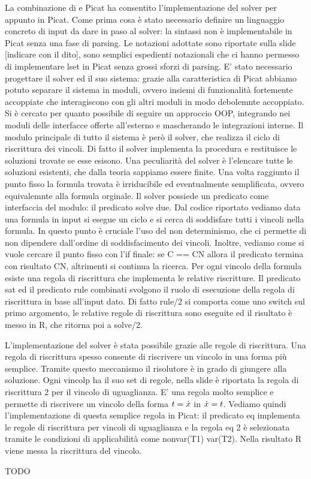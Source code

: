 \documentclass[11pt]{article}
\begin{document}
La combinazione di \lset{} e Picat ha consentito l'implementazione del
solver per \lset{} appunto in Picat. Come prima cosa è stato
necessario definire un linguaggio concreto di input da dare in paso al
solver: la sintassi \lset{} non è implementabile in Picat senza una
fase di parsing. Le notazioni adottate sono riportate sulla slide
[indicare con il dito], sono semplici espedienti notazionali che ci
hanno permesso di implementare lset in Picat senza grossi sforzi di
parsing. E' stato necessario progettare il solver ed il suo sistema:
grazie alla caratteristica di Picat abbiamo potuto separare il sistema
in moduli, ovvero insiemi di funzionalità fortemente accoppiate che
interagiscono con gli altri moduli in modo debolemnte accoppiato. Si è
cercato per quanto possibile di seguire un approccio OOP, integrando
nei moduli delle interfacce offerte all'esterno e mascherando le
integrazioni interne. Il modulo principale di tutto il sistema è però
il solver, che realizza il ciclo di riscrittura dei vincoli. Di fatto
il solver implementa la procedura \satset{} e restituisce le soluzioni
trovate se esse esisono. Una peculiarità del solver è l'elencare tutte
le soluzioni esistenti, che dalla teoria sappiamo essere finite. Una
volta raggiunto il punto fisso la formula trovata è irriducibile ed
eventualmente semplificata, ovvero equivalemnte alla formula
orginale. Il solver possiede un predicato come interfaccia del modulo:
il predicato solve due. Dal codice riportato vediamo data una formula
in input si esegue un ciclo e si cerca di soddisfare tutti i vincoli
nella formula. In questo punto è cruciale l'uso del non determinismo,
che ci permette di non dipendere dall'ordine di soddisfacimento dei
vincoli. Inoltre, vediamo come si vuole cercare il punto fisso con
l'if finale: se C == CN allora il predicato termina con risultato CN,
altrimenti si continua la ricerca. Per ogni vincolo della formula
esiste una regola di riscrittura che implementa le relative
riscritture. Il predicato sat ed il predicato rule combinati svolgono
il ruolo di esecuzione della regola di riscrittura in base all'input
dato. Di fatto rule/2 si comporta come uno switch sul primo argomento,
le relative regole di riscrittura sono eseguite ed il risultato è
messo in R, che ritorna poi a solve/2.

L'implementazione del solver è stata possibile grazie alle regole di
riscrittura. Una regola di riscrittura spesso consente di riscrivere
un vincolo in una forma più semplice. Tramite questo meccanismo il
risolutore è in grado di giungere alla soluzione. Ogni vincolp ha il
suo set di regole, nella slide è riportata la regola di riscrittura 2
per il vincolo di uguaglianza. E' una regola molto semplice e permette
di riscrivere un vincolo della forma $t = \dot{x}$ in $\dot{x} =
t$. Vediamo quindi l'implementazione di questa semplice regola in
Picat: il predicato eq implementa le regole di riscrittura per vincoli
di uguaglianza e la regola eq 2 è selezionata tramite le condizioni di
applicabilità come nonvar(T1) var(T2). Nella risultato R viene messa
la riscrittura del vincolo.

TODO
\end{document}
